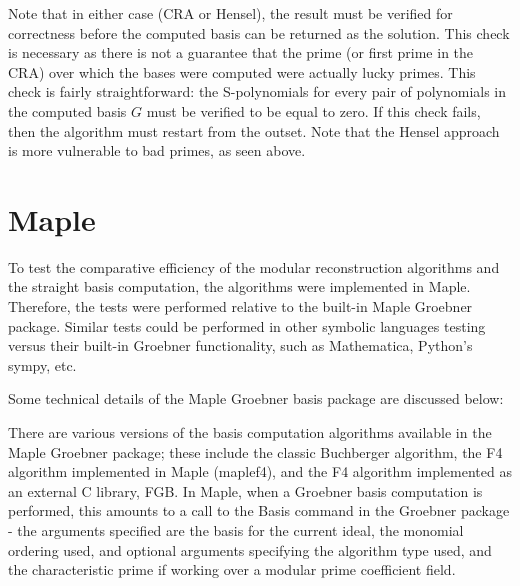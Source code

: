 \documentclass[letterpaper,12pt,titlepage,oneside,final]{book}
\begin{document}
Note that in either case (CRA or Hensel), the result must be verified for correctness before the computed basis can be returned as the solution.  This check is necessary as there is not a guarantee that the prime (or first prime in the CRA) over which the bases were computed were actually lucky primes.  This check is fairly straightforward: the S-polynomials for every pair of polynomials in the computed basis ${G}$ must be verified to be equal to zero.  If this check fails, then the algorithm must restart from the outset.  Note that the Hensel approach is more vulnerable to bad primes, as seen above.

\section{Maple}

To test the comparative efficiency of the modular reconstruction algorithms and the straight basis computation, the algorithms were implemented in Maple.  Therefore, the tests were performed relative to the built-in Maple Groebner package.  Similar tests could be performed in other symbolic languages testing versus their built-in Groebner functionality, such as Mathematica, Python's sympy, etc.  

Some technical details of the Maple Groebner basis package are discussed below:

There are various versions of the basis computation algorithms available in the Maple Groebner package; these include the classic Buchberger algorithm, the F4 algorithm implemented in Maple (maplef4), and the F4 algorithm implemented as an external C library, FGB.  In Maple, when a Groebner basis computation is performed, this amounts to a call to the Basis command in the Groebner package - the arguments specified are the basis for the current ideal, the monomial ordering used, and optional arguments specifying the algorithm type used, and the characteristic prime if working over a modular prime coefficient field.   
\end{document}
